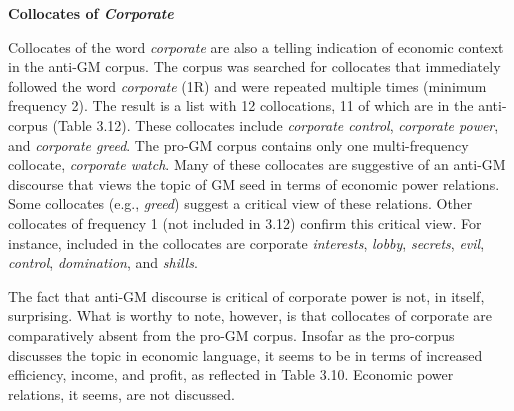 \textbf{Collocates of \textit{Corporate}}

Collocates of the word \textit{corporate} are also a telling indication of economic context in the anti-GM corpus. The corpus was searched for collocates that immediately followed the word \textit{corporate} (1R) and were repeated multiple times (minimum frequency 2). The result is a list with 12 collocations, 11 of which are in the anti-corpus (Table 3.12). These collocates include \textit{corporate control}, \textit{corporate power}, and \textit{corporate greed}. The pro-GM corpus contains only one multi-frequency collocate, \textit{corporate watch}. Many of these collocates are suggestive of an anti-GM discourse that views the topic of GM seed in terms of economic power relations. Some collocates (e.g., \textit{greed}) suggest a critical view of these relations. Other collocates of frequency 1 (not included in 3.12) confirm this critical view. For instance, included in the collocates are corporate \textit{interests}, \textit{lobby}, \textit{secrets}, \textit{evil}, \textit{control}, \textit{domination}, and \textit{shills}.  

The fact that anti-GM discourse is critical of corporate power is not, in itself, surprising. What is worthy to note, however, is that collocates of corporate are comparatively absent from the pro-GM corpus. Insofar as the pro-corpus discusses the topic in economic language, it seems to be in terms of increased efficiency, income, and profit, as reflected in Table 3.10. Economic power relations, it seems, are not discussed.   

